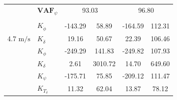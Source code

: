 \begin{table}[]
\begin{tabular}{llcccc}
                                                   & $\mathbf{VAF}_\psi$                                              & \multicolumn{2}{c}{93.03}                                                                          & \multicolumn{2}{c}{96.80}                                                                          \\
                                                   &                                                                  & \multicolumn{1}{l}{}                        & \multicolumn{1}{l}{}                                 & \multicolumn{1}{l}{}                        & \multicolumn{1}{l}{}                                 \\ \hline
                                                   & $K_{\dot{\phi}} $                                                & -143.29                                     & 58.89                                                & -164.59                                     & 112.31                                               \\
    \multirow{-2}{*}{4.7 $\si{\meter\per\second}$} & $K_{\dot{\delta}}$                                               & 19.16                                       & 50.67                                                & 22.39                                       & 106.46                                               \\
                                                   & $K_{\phi} $                                                      & -249.29                                     & 141.83                                               & -249.82                                     & 107.93                                               \\
                                                   & $K_\delta $                                                      & 2.61                                        & 3010.72                                              & 14.70                                       & 649.60                                               \\
                                                   & $K_\psi $                                                        & -175.71                                     & 75.85                                                & -209.12                                     & 111.47                                               \\
                                                   & $K_{T_\delta}$                                                   & 11.32                                       & 62.04                                                & 13.87                                       & 78.12                                                \\ \cline{2-6} 

\end{tabular}
\end{table}
